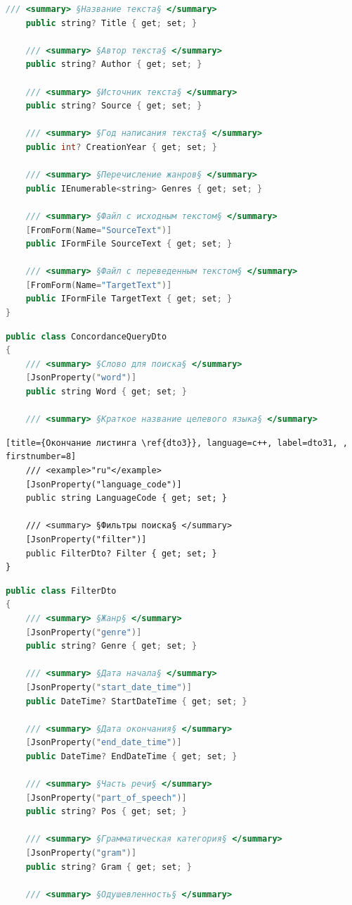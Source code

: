 \begin{lstlisting}[title={Окончание листинга \ref{dto2}}, language=c++, label=dto21, firstnumber=10]	
	/// <summary> §Название текста§ </summary>
	public string? Title { get; set; }
	
	/// <summary> §Автор текста§ </summary>
	public string? Author { get; set; }
	
	/// <summary> §Источник текста§ </summary>
	public string? Source { get; set; }
	
	/// <summary> §Год написания текста§ </summary>
	public int? CreationYear { get; set; }
	
	/// <summary> §Перечисление жанров§ </summary>
	public IEnumerable<string> Genres { get; set; }
	
	/// <summary> §Файл с исходным текстом§ </summary>
	[FromForm(Name="SourceText")]
	public IFormFile SourceText { get; set; }
	
	/// <summary> §Файл с переведенным текстом§ </summary>
	[FromForm(Name="TargetText")]
	public IFormFile TargetText { get; set; }
}
\end{lstlisting}

\begin{lstlisting}[caption={ConcordanceQueryDto}, language=c++, label=dto3]
public class ConcordanceQueryDto
{
	/// <summary> §Слово для поиска§ </summary>
	[JsonProperty("word")]
	public string Word { get; set; }
	
	/// <summary> §Краткое название целевого языка§ </summary>
\end{lstlisting}

\begin{lstlisting}[title={Окончание листинга \ref{dto3}}, language=c++, label=dto31, , firstnumber=8]
	/// <example>"ru"</example>
	[JsonProperty("language_code")]
	public string LanguageCode { get; set; }
	
	/// <summary> §Фильтры поиска§ </summary>
	[JsonProperty("filter")]
	public FilterDto? Filter { get; set; }
}
\end{lstlisting}

\begin{lstlisting}[caption={FilterQueryDto}, language=c++, label=dto4]
public class FilterDto
{
	/// <summary> §Жанр§ </summary>
	[JsonProperty("genre")]
	public string? Genre { get; set; }
	
	/// <summary> §Дата начала§ </summary>
	[JsonProperty("start_date_time")]
	public DateTime? StartDateTime { get; set; }
	
	/// <summary> §Дата окончания§ </summary>
	[JsonProperty("end_date_time")]
	public DateTime? EndDateTime { get; set; }
	
	/// <summary> §Часть речи§ </summary>
	[JsonProperty("part_of_speech")]
	public string? Pos { get; set; }
	
	/// <summary> §Грамматическая категория§ </summary>
	[JsonProperty("gram")]
	public string? Gram { get; set; }
	
	/// <summary> §Одушевленность§ </summary>
\end{lstlisting}

